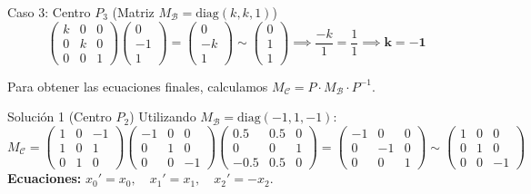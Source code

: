 {Caso 3: Centro $P_3$ (Matriz $M_{\mathcal{B}} = \text{diag}(k, k, 1)$)
$$ \begin{pmatrix} k & 0 & 0 \\ 0 & k & 0 \\ 0 & 0 & 1 \end{pmatrix} \begin{pmatrix} 0 \\ -1 \\ 1 \end{pmatrix} = \begin{pmatrix} 0 \\ -k \\ 1 \end{pmatrix} \sim \begin{pmatrix} 0 \\ 1 \\ 1 \end{pmatrix} \implies \frac{-k}{1} = \frac{1}{1} \implies \mathbf{k = -1} $$


Para obtener las ecuaciones finales, calculamos $M_{\mathcal{C}} = P \cdot M_{\mathcal{B}} \cdot P^{-1}$.

Solución 1 (Centro $P_2$)
Utilizando $M_{\mathcal{B}} = \text{diag}(-1, 1, -1)$:
$$ M_{\mathcal{C}} = \begin{pmatrix} 1 & 0 & -1 \\ 1 & 0 & 1 \\ 0 & 1 & 0 \end{pmatrix} \begin{pmatrix} -1 & 0 & 0 \\ 0 & 1 & 0 \\ 0 & 0 & -1 \end{pmatrix} \begin{pmatrix} 0.5 & 0.5 & 0 \\ 0 & 0 & 1 \\ -0.5 & 0.5 & 0 \end{pmatrix} = \begin{pmatrix} -1 & 0 & 0 \\ 0 & -1 & 0 \\ 0 & 0 & 1 \end{pmatrix} \sim \begin{pmatrix} 1 & 0 & 0 \\ 0 & 1 & 0 \\ 0 & 0 & -1 \end{pmatrix} $$
\textbf{Ecuaciones:} $x_0' = x_0, \quad x_1' = x_1, \quad x_2' = -x_2$.

}
